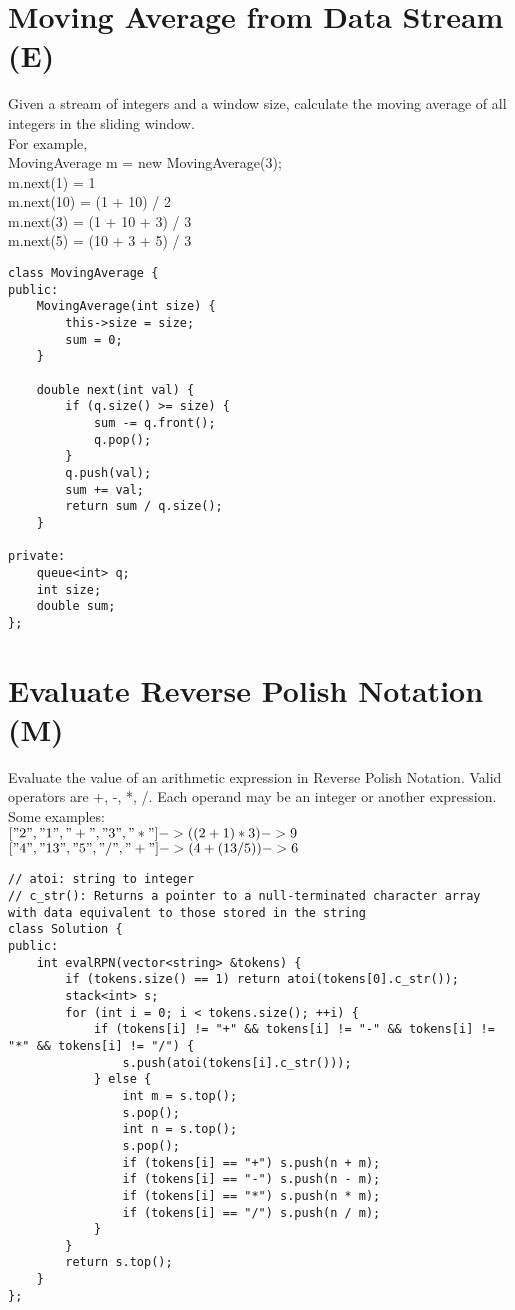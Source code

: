 \section{Moving Average from Data Stream (E)}
Given a stream of integers and a window size, calculate the moving average of all integers in the sliding window.\\

For example,\\
MovingAverage m = new MovingAverage(3);\\
m.next(1) = 1\\
m.next(10) = (1 + 10) / 2\\
m.next(3) = (1 + 10 + 3) / 3\\
m.next(5) = (10 + 3 + 5) / 3 \\

\begin{lstlisting}
class MovingAverage {
public:
    MovingAverage(int size) {
        this->size = size;
        sum = 0;
    }
    
    double next(int val) {
        if (q.size() >= size) {	
            sum -= q.front();
            q.pop();
        }
        q.push(val);
        sum += val;
        return sum / q.size();
    }
    
private:
    queue<int> q;
    int size;
    double sum;
};
\end{lstlisting}


\section{Evaluate Reverse Polish Notation (M)}
Evaluate the value of an arithmetic expression in Reverse Polish Notation. Valid operators are +, -, *, /. Each operand may be an integer or another expression.\\

Some examples:\\
  $["2", "1", "+", "3", "*"] -> ((2 + 1) * 3) -> 9$ \\
  $["4", "13", "5", "/", "+"] -> (4 + (13 / 5)) -> 6$ \\

\begin{lstlisting}
// atoi: string to integer
// c_str(): Returns a pointer to a null-terminated character array with data equivalent to those stored in the string
class Solution {
public:
    int evalRPN(vector<string> &tokens) {
        if (tokens.size() == 1) return atoi(tokens[0].c_str());
        stack<int> s;
        for (int i = 0; i < tokens.size(); ++i) {
            if (tokens[i] != "+" && tokens[i] != "-" && tokens[i] != "*" && tokens[i] != "/") {
                s.push(atoi(tokens[i].c_str()));
            } else {
                int m = s.top();
                s.pop();
                int n = s.top();
                s.pop();
                if (tokens[i] == "+") s.push(n + m);
                if (tokens[i] == "-") s.push(n - m);
                if (tokens[i] == "*") s.push(n * m);
                if (tokens[i] == "/") s.push(n / m);
            }
        }
        return s.top();
    }
};
\end{lstlisting}




